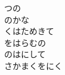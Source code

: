 \documentclass[10pt,b5j]{tarticle} %
\begin{document}
\begin{enumerate}
\begin{minipage}[c]{\blocksize}
        \vspace{\linespace}
        \item
        つの\\
        のかな\\
        くはためきて\\
        をはらむの\\
        のはにして\\
        さかまくをにく
    
    \end{minipage}
\end{enumerate} %
\end{document}
